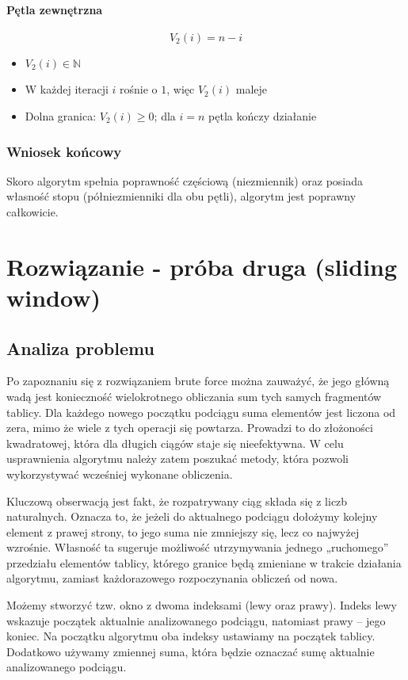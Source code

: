 \documentclass{article}
\begin{document}
\paragraph{Pętla zewnętrzna}
\[
V_2(i) = n - i
\]
\begin{itemize}
    \item $V_2(i) \in \mathbb{N}$
    \item W każdej iteracji $i$ rośnie o $1$, więc $V_2(i)$ maleje
    \item Dolna granica: $V_2(i) \ge 0$; dla $i = n$ pętla kończy działanie
\end{itemize}

\subsubsection{Wniosek końcowy}
Skoro algorytm spełnia poprawność częściową (niezmiennik) oraz posiada własność stopu (półniezmienniki dla obu pętli), algorytm jest poprawny całkowicie.

\section{Rozwiązanie - próba druga (sliding window)}

\subsection{Analiza problemu}
Po zapoznaniu się z rozwiązaniem brute force można zauważyć, że jego główną wadą jest konieczność wielokrotnego obliczania sum tych samych fragmentów tablicy. Dla każdego nowego początku podciągu suma elementów jest liczona od zera, mimo że wiele z tych operacji się powtarza. Prowadzi to do złożoności kwadratowej, która dla długich ciągów staje się nieefektywna. W celu usprawnienia algorytmu należy zatem poszukać metody, która pozwoli wykorzystywać wcześniej wykonane obliczenia.

Kluczową obserwacją jest fakt, że rozpatrywany ciąg składa się z liczb naturalnych. Oznacza to, że jeżeli do aktualnego podciągu dołożymy kolejny element z prawej strony, to jego suma nie zmniejszy się, lecz co najwyżej wzrośnie. Własność ta sugeruje możliwość utrzymywania jednego „ruchomego” przedziału elementów tablicy, którego granice będą zmieniane w trakcie działania algorytmu, zamiast każdorazowego rozpoczynania obliczeń od nowa.

Możemy stworzyć tzw. okno z dwoma indeksami (lewy oraz prawy). Indeks lewy wskazuje początek aktualnie analizowanego podciągu, natomiast prawy – jego koniec. Na początku algorytmu oba indeksy ustawiamy na początek tablicy. Dodatkowo używamy zmiennej suma, która będzie oznaczać sumę aktualnie analizowanego podciągu.
\end{document}
